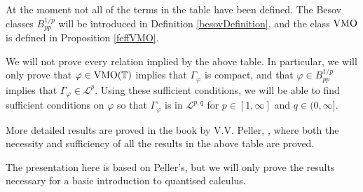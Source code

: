 At the moment not all of the terms in the table have been defined. The Besov
classes $B_{pp}^{1/p}$ will be introduced in Definition \ref{besovDefinition},
and the class $\operatorname{VMO}$ is defined in Proposition \ref{feffVMO}.

We will not prove every relation implied by the above table. In particular, we will
only prove that $\varphi \in \operatorname{VMO}(\mathbb{T})$ implies that $\Gamma_\varphi$ is compact,
and that $\varphi \in B_{pp}^{1/p}$ implies that $\Gamma_\varphi \in \mathcal{L}^p$.
Using these sufficient conditions, we will be able to find sufficient conditions
on $\varphi$ so that $\Gamma_\varphi$ is in $\mathcal{L}^{p,q}$ for $p \in [1,\infty]$
and $q \in (0,\infty]$. 

More detailed results are proved in the book by V.V. Peller, \cite{Peller2003},
where both the necessity and sufficiency of all the results in the above table are proved.

The presentation here is based on Peller's, but we will only prove the results
necessary for a basic introduction to quantised calculus.

